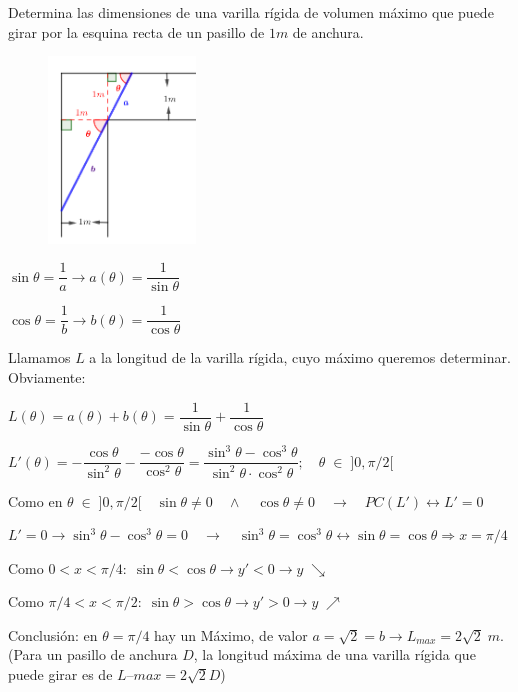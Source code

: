 	\begin{ejre}
		Determina las dimensiones de una varilla rígida de volumen máximo que puede girar por la esquina recta de un pasillo de $1m$ de anchura.
	\end{ejre}
	

	
	\begin{proofw}\renewcommand{\qedsymbol}{$\diamond$}	
	
	\begin{multicols}{2}
		
	\begin{figure}[H]
		\centering
		\includegraphics[width=0.35\textwidth]{imagenes/imagenes05/T05IM53.png}
	\end{figure}
		\hspace{5mm}$\sin \theta = \dfrac  {1}  {a} \to a(\theta)= \dfrac {1}{\sin \theta}$ 
		
		$\cos \theta = \dfrac  {1}  {b} \to b(\theta)= \dfrac {1}{\cos \theta}$
		
		Llamamos $L$ a la longitud de la varilla rígida, cuyo máximo queremos determinar. Obviamente:
		
		$L(\theta)=a(\theta)+b(\theta)=\dfrac {1}{\sin \theta} + \dfrac {1}{\cos \theta}$
		
		$L'(\theta)=-\dfrac {\cos \theta}{\sin^2 \theta} - \dfrac {-\cos \theta}{\cos^2 \theta}=\dfrac {\sin^3 \theta - \cos^3 \theta}{\sin^2 \theta \cdot \cos^2 \theta}; \quad \theta\; \in\; ]0,\pi/2[$
	\end{multicols}

	Como en $\theta\; \in\; ]0,\pi/2[ \quad \sin \theta \neq 0 \quad \wedge \quad \cos \theta \neq 0 \quad \to \quad PC(L') \leftrightarrow L'=0$
	
	$L'=0 \to \sin^3 \theta - \cos^3 \theta = 0 \quad \to \quad \sin^3 \theta = \cos^3 \theta \leftrightarrow \sin \theta = \cos \theta \Rightarrow x=\pi/4$	
	
	Como $0<x<\pi/4: \; \sin \theta < \cos \theta \to y'<0 \to y\; \searrow$
	
	Como $\pi/4<x<\pi/2: \; \sin \theta > \cos \theta \to y'>0 \to y\; \nearrow$
	
	Conclusión: en $\theta = \pi/4$ hay un Máximo, de valor $a=\sqrt{2}=b \to L_{max}=2\sqrt{2} \; m$. \textcolor{gris}{(Para un pasillo de anchura $D$, la longitud máxima de una varilla rígida que puede girar es de $L–{max}=2\sqrt{2}D$)}
	
	\end{proofw}

